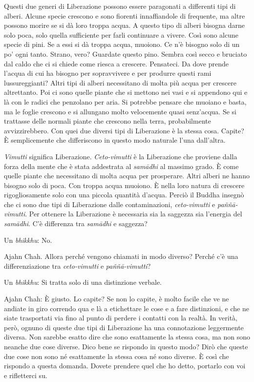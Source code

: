 Questi due generi di Liberazione possono essere paragonati a differenti
tipi di alberi. Alcune specie crescono e sono fiorenti innaffiandole di
frequente, ma altre possono morire se si dà loro troppa acqua. A questo
tipo di alberi bisogna darne solo poca, solo quella sufficiente per
farli continuare a vivere. Così sono alcune specie di pini. Se a essi si
dà troppa acqua, muoiono. Ce n'è bisogno solo di un po' ogni tanto.
Strano, vero? Guardate questo pino. Sembra così secco e bruciato dal
caldo che ci si chiede come riesca a crescere. Pensateci. Da dove prende
l'acqua di cui ha bisogno per sopravvivere e per produrre questi rami
lussureggianti? Altri tipi di alberi necessitano di molta più acqua per
crescere altrettanto. Poi ci sono quelle piante che si mettono nei vasi
e si appendono qui e là con le radici che penzolano per aria. Si
potrebbe pensare che muoiano e basta, ma le foglie crescono e si
allungano molto velocemente quasi senz'acqua. Se si trattasse delle
normali piante che crescono nella terra, probabilmente avvizzirebbero.
Con quei due diversi tipi di Liberazione è la stessa cosa. Capite? È
semplicemente che differiscono in questo modo naturale l'una dall'altra.

\emph{Vimutti} significa Liberazione. \emph{Ceto-vimutti} è la
Liberazione che proviene dalla forza della mente che è stata addestrata
al \emph{samādhi} al massimo grado. È come quelle piante che necessitano
di molta acqua per prosperare. Altri alberi ne hanno bisogno solo di
poca. Con troppa acqua muoiono. È nella loro natura di crescere
rigogliosamente solo con una piccola quantità d'acqua. Perciò il Buddha
insegnò che ci sono due tipi di Liberazione dalle contaminazioni,
\emph{ceto-vimutti} e \emph{paññā-vimutti}. Per ottenere la Liberazione
è necessaria sia la saggezza sia l'energia del \emph{samādhi}. C'è
differenza tra \emph{samādhi} e saggezza?

Un \emph{bhikkhu}: No.

Ajahn Chah. Allora perché vengono chiamati in modo diverso? Perché c'è
una differenziazione tra \emph{ceto-vimutti} e \emph{paññā-vimutti}?

Un \emph{bhikkhu}: Si tratta solo di una distinzione verbale.

Ajahn Chah: È giusto. Lo capite? Se non lo capite, è molto facile che ve
ne andiate in giro correndo qua e là a etichettare le cose e a fare
distinzioni, e che ne siate trasportati via fino al punto di perdere i
contatti con la realtà. In verità, però, ognuno di queste due tipi di
Liberazione ha una connotazione leggermente diversa. Non sarebbe esatto
dire che sono esattamente la stessa cosa, ma non sono neanche due cose
diverse. Dico bene se rispondo in questo modo? Dirò che queste due cose
non sono né esattamente la stessa cosa né sono diverse. È così che
rispondo a questa domanda. Dovete prendere quel che ho detto, portarlo
con voi e rifletterci su.

